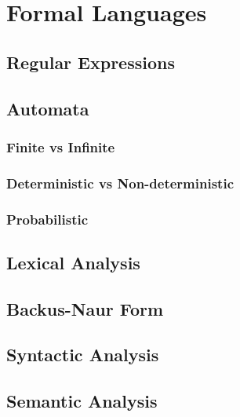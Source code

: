 \chapter{Formal Languages}
\label{ch:compilers}


\section{Regular Expressions}


\section{Automata}


\subsection{Finite vs Infinite}


\subsection{Deterministic vs Non-deterministic}


\subsection{Probabilistic}


\section{Lexical Analysis}


\section{Backus-Naur Form}


\section{Syntactic Analysis}


\section{Semantic Analysis}
